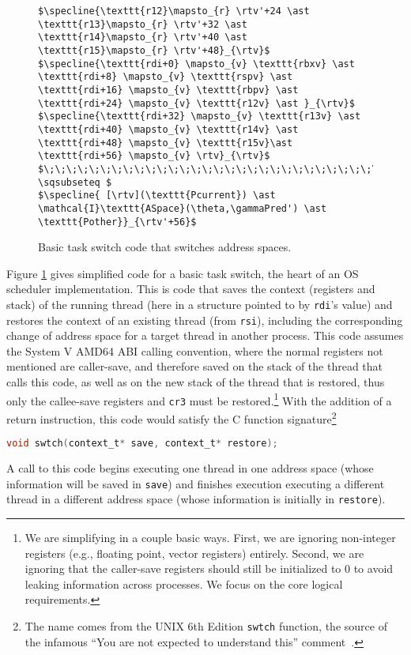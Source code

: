 \begin{figure}
\begin{lstlisting}
$\specline{\texttt{r12}\mapsto_{r} \rtv'+24 \ast \texttt{r13}\mapsto_{r} \rtv'+32 \ast \texttt{r14}\mapsto_{r} \rtv'+40 \ast \texttt{r15}\mapsto_{r} \rtv'+48}_{\rtv}$
$\specline{\texttt{rdi+0} \mapsto_{v} \texttt{rbxv} \ast \texttt{rdi+8} \mapsto_{v} \texttt{rspv} \ast \texttt{rdi+16} \mapsto_{v} \texttt{rbpv} \ast  \texttt{rdi+24} \mapsto_{v} \texttt{r12v} \ast }_{\rtv}$
$\specline{\texttt{rdi+32} \mapsto_{v} \texttt{r13v} \ast \texttt{rdi+40} \mapsto_{v} \texttt{r14v} \ast \texttt{rdi+48} \mapsto_{v} \texttt{r15v}\ast \texttt{rdi+56} \mapsto_{v} \rtv}_{\rtv}$
$\;\;\;\;\;\;\;\;\;\;\;\;\;\;\;\;\;\;\;\;\;\;\;\;\;\;\;\;\;\;\;\;\;\;\;\;\;\;\;\;\;\;\;\; \sqsubseteq $
$\specline{ [\rtv](\texttt{Pcurrent}) \ast \mathcal{I}\texttt{ASpace}(\theta,\gammaPred') \ast \texttt{Pother}}_{\rtv'+56}$
\end{lstlisting}
\caption{Basic task switch code that switches address spaces.}
\label{fig:swtch}
\end{figure}

Figure \ref{fig:swtch} gives simplified code for a basic task switch, the heart of an OS scheduler implementation. This is code that saves the context (registers and stack) of the running thread (here in a structure pointed to by \lstinline|rdi|'s value) and restores the context of an existing thread (from \lstinline|rsi|), including the corresponding change of address space for a target thread in another process.
This code assumes the System V AMD64 ABI calling convention, where the normal registers not mentioned are caller-save, and therefore saved on the stack of the thread that calls this code, as well as on the new stack of the thread that is restored, thus only the callee-save registers and \texttt{cr3} must be restored.\footnote{We are simplifying in a couple basic ways. First, we are ignoring non-integer registers (e.g., floating point, vector registers) entirely. Second, we are ignoring that the caller-save registers should still be initialized to 0 to avoid leaking information across processes. We focus on the core logical requirements.}
With the addition of a return instruction, this code would satisfy the C function signature\footnote{The name comes from the UNIX 6th Edition \lstinline|swtch| function, the source of the infamous ``You are not expected to understand this'' comment~\cite{lions1996lions}.}
\begin{lstlisting}[language=C]
void swtch(context_t* save, context_t* restore);
\end{lstlisting}
A call to this code begins executing one thread in one address space (whose information will be saved in \lstinline[language=C]|save|) and finishes execution executing a different thread in a different address space (whose information is initially in \lstinline[language=C]|restore|).

